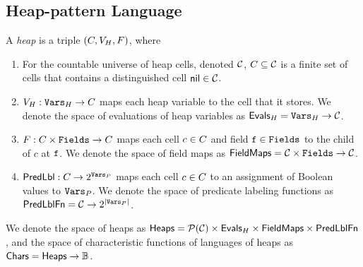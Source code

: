 \subsection{Heap-pattern Language}
\label{sec:patterns}

\begin{defn}
  \label{defn:states}
  A \lang \emph{heap} is a triple $(C, V_H,
  F)$, where
  \begin{enumerate}
  \item
    For the countable universe of heap cells, denoted $\mathcal{C}$,
    $C \subseteq \mathcal{C}$ is a finite set of cells that contains
    a distinguished cell $\mathsf{nil} \in \mathcal{C}$.
  \item
    $V_H: \mathtt{Vars}_H \to C$ maps each heap variable to
    the cell that it stores.
    We denote the space of evaluations of heap variables as
    $\mathsf{Evals}_H = \mathtt{Vars}_H \to \mathcal{C}$.
  \item
    $F: C \times \mathtt{Fields} \to C$ maps each cell
    $c \in C$ and field $\mathtt{f} \in \mathtt{Fields}$ to the child of
    $c$ at $\mathtt{f}$.
    We denote the space of field maps as $\mathsf{FieldMaps} = \mathcal{C} \times
    \mathtt{Fields} \to \mathcal{C}$.

  \item
    $\mathsf{PredLbl}: C \to 2^{\mathtt{Vars}_P}$ maps each cell
    $c \in C$ to an assignment of Boolean values to $\mathtt{Vars}_P$.
    We denote the space of predicate labeling functions as
    $\mathsf{PredLblFn} = \mathcal{C} \to 2^{|\mathtt{Vars}_P|}$.

  \end{enumerate}
  We denote the space of heaps as $\mathsf{Heaps} = \mathcal{P}(\mathcal{C}) \times
  \mathsf{Evals}_H \times \mathsf{FieldMaps} \times \mathsf{PredLblFn}$, and the space of
  characteristic functions of languages of heaps as $\mathsf{Chars} = \mathsf{Heaps}
  \to \mathbb{B}$.
\end{defn}


